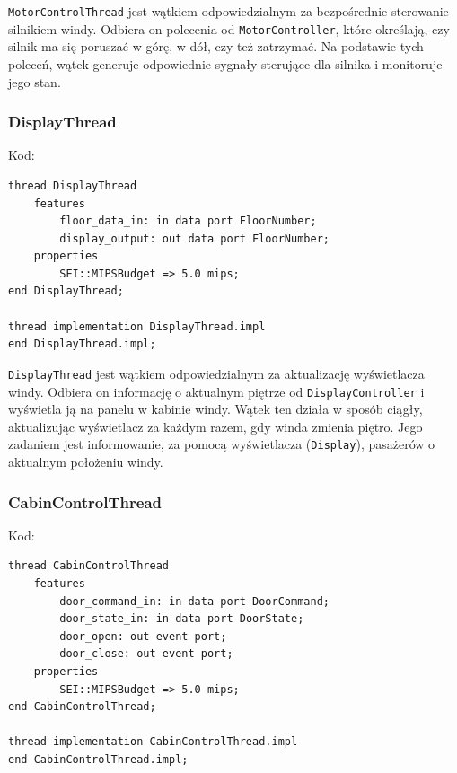 \documentclass{article}
\begin{document}
    \texttt{MotorControlThread} jest wątkiem odpowiedzialnym za bezpośrednie sterowanie silnikiem windy. Odbiera on polecenia od \texttt{MotorController}, które określają, czy silnik ma się poruszać w górę, w dół, czy też zatrzymać. Na podstawie tych poleceń, wątek generuje odpowiednie sygnały sterujące dla silnika i monitoruje jego stan.


    \subsubsection{DisplayThread}

    Kod:
    
    \begin{lstlisting}[basicstyle=\ttfamily, keywordstyle=\bfseries]
thread DisplayThread
    features
        floor_data_in: in data port FloorNumber;
        display_output: out data port FloorNumber;
    properties
        SEI::MIPSBudget => 5.0 mips; 
end DisplayThread;

thread implementation DisplayThread.impl
end DisplayThread.impl;
    \end{lstlisting}

    \texttt{DisplayThread} jest wątkiem odpowiedzialnym za aktualizację wyświetlacza windy. Odbiera on informację o aktualnym piętrze od \texttt{DisplayController} i wyświetla ją na panelu w kabinie windy. Wątek ten działa w sposób ciągły, aktualizując wyświetlacz za każdym razem, gdy winda zmienia piętro. Jego zadaniem jest informowanie, za pomocą wyświetlacza (\texttt{Display}), pasażerów o aktualnym położeniu windy.




    \subsubsection{CabinControlThread}

    Kod:
    
    \begin{lstlisting}[basicstyle=\ttfamily, keywordstyle=\bfseries]
thread CabinControlThread
    features
        door_command_in: in data port DoorCommand;
        door_state_in: in data port DoorState;
        door_open: out event port;
        door_close: out event port;
    properties
        SEI::MIPSBudget => 5.0 mips; 
end CabinControlThread;

thread implementation CabinControlThread.impl
end CabinControlThread.impl;
    \end{lstlisting}
\end{document}
